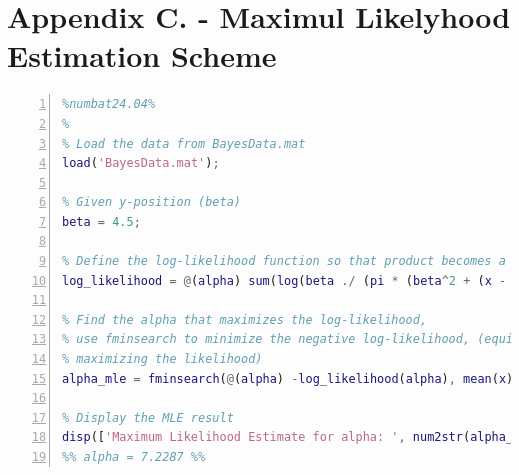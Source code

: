 \documentclass[a4paper,11pt]{article}
\begin{document}
\newpage
\section{Appendix C. - Maximul Likelyhood Estimation Scheme}
\begin{lstlisting}[language=Matlab,
                   numbers=left,
                   basicstyle=\small,
                   stepnumber=1,
                   numbersep=10pt,
                   tabsize=2,
                   showspaces=false,
                   showstringspaces=false]
%%%%%%%%%Estimating alpha using Maximum Likelyhood Solution%%%%%%%%%%%%
%numbat24.04%
%
% Load the data from BayesData.mat
load('BayesData.mat');

% Given y-position (beta)
beta = 4.5;

% Define the log-likelihood function so that product becomes a sum
log_likelihood = @(alpha) sum(log(beta ./ (pi * (beta^2 + (x - alpha).^2))));

% Find the alpha that maximizes the log-likelihood, 
% use fminsearch to minimize the negative log-likelihood, (equivalent to
% maximizing the likelihood)
alpha_mle = fminsearch(@(alpha) -log_likelihood(alpha), mean(x));

% Display the MLE result
disp(['Maximum Likelihood Estimate for alpha: ', num2str(alpha_mle)]);
%% alpha = 7.2287 %%
\end{lstlisting}
\end{document}
